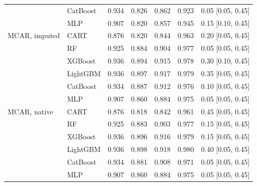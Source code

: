 \documentclass[pdflatex,sn-mathphys]{sn-jnl}
\theoremstyle{thmstyleone}
\begin{document}
\begin{table}[htbp]
\begin{tabular}{@{}llrrrrl@{}}
 & CatBoost & 0.934 & 0.826 & 0.862 & 0.923 & 0.05 [0.05, 0.45] \\
 & MLP & 0.907 & 0.820 & 0.857 & 0.945 & 0.15 [0.10, 0.45] \\
\midrule
MCAR, imputed & CART & 0.876 & 0.820 & 0.844 & 0.963 & 0.20 [0.05, 0.45] \\
 & RF & 0.925 & 0.884 & 0.904 & 0.977 & 0.05 [0.05, 0.45] \\
 & XGBoost & 0.936 & 0.894 & 0.915 & 0.978 & 0.30 [0.10, 0.45] \\
 & LightGBM & 0.936 & 0.897 & 0.917 & 0.979 & 0.35 [0.05, 0.45] \\
 & CatBoost & 0.934 & 0.887 & 0.912 & 0.976 & 0.10 [0.05, 0.45] \\
 & MLP & 0.907 & 0.860 & 0.884 & 0.975 & 0.05 [0.05, 0.45] \\
\midrule
MCAR, native & CART & 0.876 & 0.818 & 0.842 & 0.961 & 0.45 [0.05, 0.45] \\
 & RF & 0.925 & 0.883 & 0.903 & 0.977 & 0.15 [0.05, 0.45] \\
 & XGBoost & 0.936 & 0.896 & 0.916 & 0.979 & 0.15 [0.05, 0.45] \\
 & LightGBM & 0.936 & 0.898 & 0.918 & 0.980 & 0.40 [0.05, 0.45] \\
 & CatBoost & 0.934 & 0.881 & 0.908 & 0.971 & 0.05 [0.05, 0.45] \\
 & MLP & 0.907 & 0.860 & 0.884 & 0.975 & 0.05 [0.05, 0.45] \\
\bottomrule
\end{tabular}
\end{table}
\end{document}
